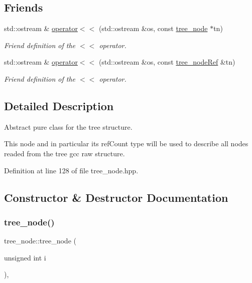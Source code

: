\subsection*{Friends}
\begin{DoxyCompactItemize}
\item 
std\+::ostream \& \hyperlink{classtree__node_a7abb3e56ee52f67b970bbafb18bbddc9}{operator$<$$<$} (std\+::ostream \&os, const \hyperlink{classtree__node}{tree\+\_\+node} $\ast$tn)
\begin{DoxyCompactList}\small\item\em Friend definition of the $<$$<$ operator. \end{DoxyCompactList}\item 
std\+::ostream \& \hyperlink{classtree__node_a04c3200a2247133cf590eff539d97021}{operator$<$$<$} (std\+::ostream \&os, const \hyperlink{tree__node_8hpp_a6ee377554d1c4871ad66a337eaa67fd5}{tree\+\_\+node\+Ref} \&tn)
\begin{DoxyCompactList}\small\item\em Friend definition of the $<$$<$ operator. \end{DoxyCompactList}\end{DoxyCompactItemize}


\subsection{Detailed Description}
Abstract pure class for the tree structure. 

This node and in particular its ref\+Count type will be used to describe all nodes readed from the tree gcc raw structure. 

Definition at line 128 of file tree\+\_\+node.\+hpp.



\subsection{Constructor \& Destructor Documentation}
\mbox{\label{classtree__node_a5e40829fa0df70a89f974c8e6f0242aa}} 
\subsubsection{\texorpdfstring{tree\+\_\+node()}{tree\_node()}}
{\footnotesize\ttfamily tree\+\_\+node\+::tree\+\_\+node (\begin{DoxyParamCaption}\item[{unsigned int}]{i }\end{DoxyParamCaption})\hspace{0.3cm}{\ttfamily [inline]}, {\ttfamily [explicit]}}




